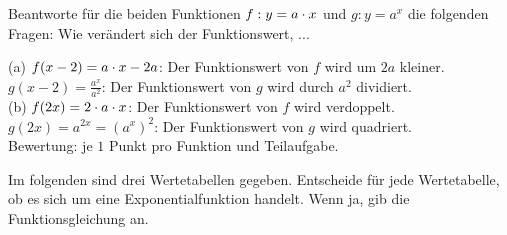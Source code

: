 \documentclass[11pt]{exam}
\begin{document}
\newpage
\begin{questions}
\noaddpoints
\question[\totalpoints]
\addpoints
Beantworte für die beiden Funktionen $f:y=a\cdot x$ und $g:y=a^x$ die folgenden Fragen: Wie verändert sich der Funktionswert, ...
{\begin{solution}
		(a) $f(x-2)=a\cdot x-2a$: Der Funktionswert von $f$ wird um $2a$ kleiner. $g(x-2)=\frac{a^x}{a^2}$: Der Funktionswert von $g$ wird durch $a^2$ dividiert.\\
		(b) $f(2x)=2\cdot a\cdot x$: Der Funktionswert von $f$ wird verdoppelt. $g(2x)=a^{2x}=\left(a^x\right)^2$: Der Funktionswert von $g$ wird quadriert.\\
		Bewertung: je $1$ Punkt pro Funktion und Teilaufgabe.
\end{solution}}
{\vfill}

\question[3]
Im folgenden sind drei Wertetabellen gegeben. Entscheide für jede Wertetabelle, ob es sich um eine Exponentialfunktion handelt. Wenn ja, gib die Funktionsgleichung an.
\end{questions}
\end{document}
